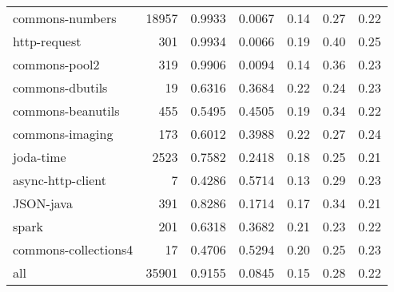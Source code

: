 \begin{table*}
\begin{tabular}{lrrrrrr}
        commons-numbers &  18957 &          0.9933 &          0.0067 &         0.14 &         0.27 &             0.22 \\
           http-request &    301 &          0.9934 &          0.0066 &         0.19 &         0.40 &             0.25 \\
          commons-pool2 &    319 &          0.9906 &          0.0094 &         0.14 &         0.36 &             0.23 \\
        commons-dbutils &     19 &          0.6316 &          0.3684 &         0.22 &         0.24 &             0.23 \\
      commons-beanutils &    455 &          0.5495 &          0.4505 &         0.19 &         0.34 &             0.22 \\
        commons-imaging &    173 &          0.6012 &          0.3988 &         0.22 &         0.27 &             0.24 \\
              joda-time &   2523 &          0.7582 &          0.2418 &         0.18 &         0.25 &             0.21 \\
      async-http-client &      7 &          0.4286 &          0.5714 &         0.13 &         0.29 &             0.23 \\
              JSON-java &    391 &          0.8286 &          0.1714 &         0.17 &         0.34 &             0.21 \\
                  spark &    201 &          0.6318 &          0.3682 &         0.21 &         0.23 &             0.22 \\
   commons-collections4 &     17 &          0.4706 &          0.5294 &         0.20 &         0.25 &             0.23 \\
                    all &  35901 &          0.9155 &          0.0845 &         0.15 &         0.28 &             0.22 \\
\bottomrule
\end{tabular}
\end{table*}
